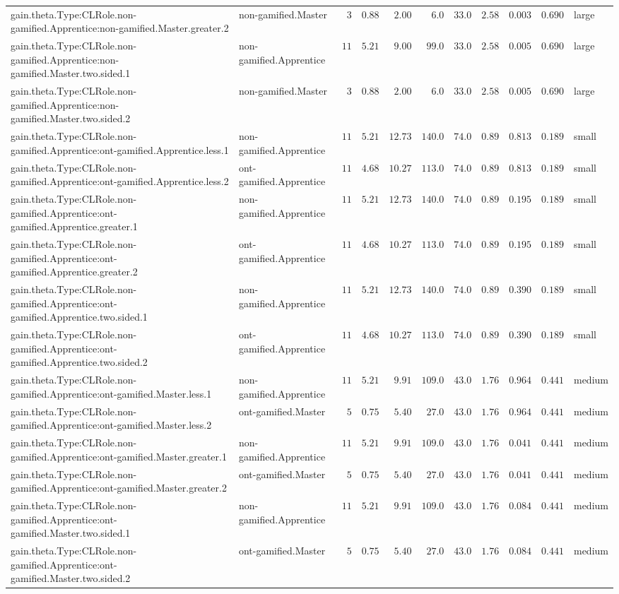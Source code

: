 \documentclass[6pt]{article}
\begin{document}
\begin{landscape}
{\begin{longtable}{llrrrrrrrrl}
gain.theta.Type:CLRole.non-gamified.Apprentice:non-gamified.Master.greater.2&non-gamified.Master&$ 3$&$0.88$&$ 2.00$&$  6.0$&$ 33.0$&$ 2.58$&$0.003$&$0.690$&large\tabularnewline
gain.theta.Type:CLRole.non-gamified.Apprentice:non-gamified.Master.two.sided.1&non-gamified.Apprentice&$11$&$5.21$&$ 9.00$&$ 99.0$&$ 33.0$&$ 2.58$&$0.005$&$0.690$&large\tabularnewline
gain.theta.Type:CLRole.non-gamified.Apprentice:non-gamified.Master.two.sided.2&non-gamified.Master&$ 3$&$0.88$&$ 2.00$&$  6.0$&$ 33.0$&$ 2.58$&$0.005$&$0.690$&large\tabularnewline
gain.theta.Type:CLRole.non-gamified.Apprentice:ont-gamified.Apprentice.less.1&non-gamified.Apprentice&$11$&$5.21$&$12.73$&$140.0$&$ 74.0$&$ 0.89$&$0.813$&$0.189$&small\tabularnewline
gain.theta.Type:CLRole.non-gamified.Apprentice:ont-gamified.Apprentice.less.2&ont-gamified.Apprentice&$11$&$4.68$&$10.27$&$113.0$&$ 74.0$&$ 0.89$&$0.813$&$0.189$&small\tabularnewline
gain.theta.Type:CLRole.non-gamified.Apprentice:ont-gamified.Apprentice.greater.1&non-gamified.Apprentice&$11$&$5.21$&$12.73$&$140.0$&$ 74.0$&$ 0.89$&$0.195$&$0.189$&small\tabularnewline
gain.theta.Type:CLRole.non-gamified.Apprentice:ont-gamified.Apprentice.greater.2&ont-gamified.Apprentice&$11$&$4.68$&$10.27$&$113.0$&$ 74.0$&$ 0.89$&$0.195$&$0.189$&small\tabularnewline
gain.theta.Type:CLRole.non-gamified.Apprentice:ont-gamified.Apprentice.two.sided.1&non-gamified.Apprentice&$11$&$5.21$&$12.73$&$140.0$&$ 74.0$&$ 0.89$&$0.390$&$0.189$&small\tabularnewline
gain.theta.Type:CLRole.non-gamified.Apprentice:ont-gamified.Apprentice.two.sided.2&ont-gamified.Apprentice&$11$&$4.68$&$10.27$&$113.0$&$ 74.0$&$ 0.89$&$0.390$&$0.189$&small\tabularnewline
gain.theta.Type:CLRole.non-gamified.Apprentice:ont-gamified.Master.less.1&non-gamified.Apprentice&$11$&$5.21$&$ 9.91$&$109.0$&$ 43.0$&$ 1.76$&$0.964$&$0.441$&medium\tabularnewline
gain.theta.Type:CLRole.non-gamified.Apprentice:ont-gamified.Master.less.2&ont-gamified.Master&$ 5$&$0.75$&$ 5.40$&$ 27.0$&$ 43.0$&$ 1.76$&$0.964$&$0.441$&medium\tabularnewline
gain.theta.Type:CLRole.non-gamified.Apprentice:ont-gamified.Master.greater.1&non-gamified.Apprentice&$11$&$5.21$&$ 9.91$&$109.0$&$ 43.0$&$ 1.76$&$0.041$&$0.441$&medium\tabularnewline
gain.theta.Type:CLRole.non-gamified.Apprentice:ont-gamified.Master.greater.2&ont-gamified.Master&$ 5$&$0.75$&$ 5.40$&$ 27.0$&$ 43.0$&$ 1.76$&$0.041$&$0.441$&medium\tabularnewline
gain.theta.Type:CLRole.non-gamified.Apprentice:ont-gamified.Master.two.sided.1&non-gamified.Apprentice&$11$&$5.21$&$ 9.91$&$109.0$&$ 43.0$&$ 1.76$&$0.084$&$0.441$&medium\tabularnewline
gain.theta.Type:CLRole.non-gamified.Apprentice:ont-gamified.Master.two.sided.2&ont-gamified.Master&$ 5$&$0.75$&$ 5.40$&$ 27.0$&$ 43.0$&$ 1.76$&$0.084$&$0.441$&medium\tabularnewline

\end{longtable}}
\end{landscape}
\end{document}
